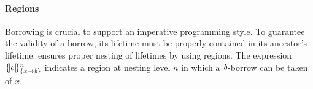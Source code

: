 
\paragraph{Regions}
\label{sdtyping:regions}




Borrowing is crucial to support an imperative programming style.
To guarantee the validity of a borrow, its lifetime must be properly contained in its
ancestor's lifetime. \lang ensures proper nesting of lifetimes by using
regions. The expression $\region{\Sone x\BORROW}{e}$ indicates a
region at nesting level $n$ in which a $\BORROW$-borrow can be taken of $x$.

